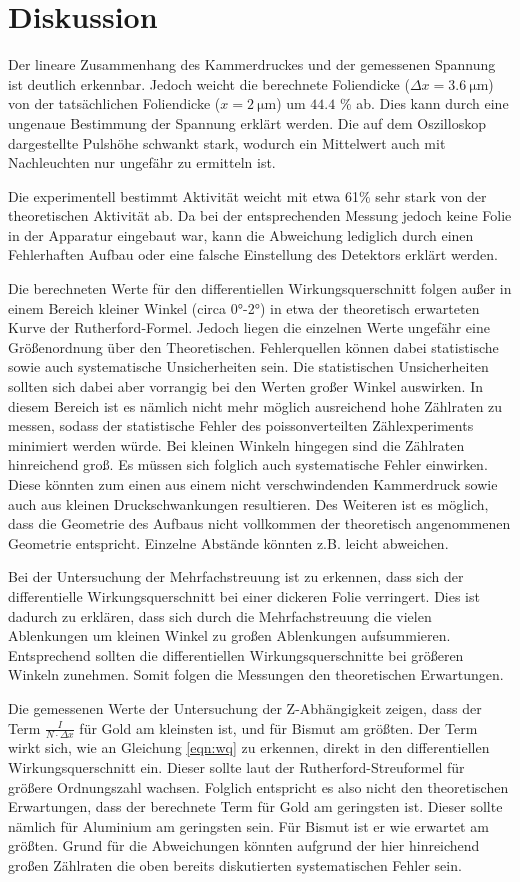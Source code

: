 \section{Diskussion}
\label{sec:Diskussion}
Der lineare Zusammenhang des Kammerdruckes und der gemessenen Spannung ist deutlich erkennbar. Jedoch weicht die
berechnete Foliendicke ($\Delta x = \SI{3.6}{\micro\meter}$) von der tatsächlichen Foliendicke ($x = \SI{2}{\micro\meter}$)
um $44.4$ \% ab. Dies kann durch eine ungenaue Bestimmung der Spannung erklärt werden. Die auf dem Oszilloskop
dargestellte Pulshöhe schwankt stark, wodurch ein Mittelwert auch mit Nachleuchten nur ungefähr zu ermitteln ist.

Die experimentell bestimmt Aktivität weicht mit etwa 61\% sehr stark von der theoretischen Aktivität ab.
Da bei der entsprechenden Messung jedoch keine Folie in der Apparatur eingebaut war,
kann die Abweichung lediglich durch einen Fehlerhaften Aufbau oder eine falsche
Einstellung des Detektors erklärt werden.

Die berechneten Werte für den differentiellen Wirkungsquerschnitt folgen außer in
einem Bereich kleiner Winkel (circa 0°-2°) in etwa der theoretisch erwarteten Kurve
der Rutherford-Formel. Jedoch liegen die einzelnen Werte ungefähr eine Größenordnung
über den Theoretischen. Fehlerquellen können dabei statistische sowie auch systematische
Unsicherheiten sein. Die statistischen Unsicherheiten sollten sich dabei aber vorrangig bei
den Werten großer Winkel auswirken. In diesem Bereich ist es nämlich nicht mehr möglich
ausreichend hohe Zählraten zu messen, sodass der statistische Fehler des poissonverteilten
Zählexperiments minimiert werden würde. Bei kleinen Winkeln hingegen sind die Zählraten hinreichend
groß. Es müssen sich folglich auch systematische Fehler einwirken. Diese könnten
zum einen aus einem nicht verschwindenden Kammerdruck sowie auch aus kleinen Druckschwankungen
resultieren. Des Weiteren ist es möglich, dass die Geometrie des Aufbaus nicht vollkommen der
theoretisch angenommenen Geometrie entspricht. Einzelne Abstände könnten z.B. leicht abweichen.

Bei der Untersuchung der Mehrfachstreuung ist zu erkennen, dass sich der differentielle Wirkungsquerschnitt
bei einer dickeren Folie verringert. Dies ist dadurch zu erklären, dass sich durch die
Mehrfachstreuung die vielen Ablenkungen um kleinen Winkel zu großen Ablenkungen aufsummieren.
Entsprechend sollten die differentiellen Wirkungsquerschnitte bei größeren Winkeln zunehmen.
Somit folgen die Messungen den theoretischen Erwartungen.

Die gemessenen Werte der Untersuchung der Z-Abhängigkeit zeigen, dass der Term $\frac{I}{N\cdot \Delta x}$
für Gold am kleinsten ist, und für Bismut am größten. Der Term wirkt sich, wie an
Gleichung \ref{eqn:wq} zu erkennen, direkt in den differentiellen Wirkungsquerschnitt ein.
Dieser sollte laut der Rutherford-Streuformel für größere Ordnungszahl wachsen.
Folglich entspricht es also nicht den theoretischen Erwartungen, dass der berechnete
Term für Gold am geringsten ist. Dieser sollte nämlich für Aluminium am geringsten sein.
Für Bismut ist er wie erwartet am größten. Grund für die Abweichungen könnten aufgrund
der hier hinreichend großen Zählraten die oben bereits diskutierten systematischen
Fehler sein.
